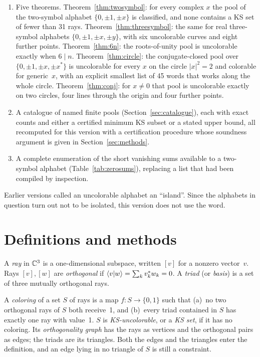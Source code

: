 \begin{enumerate}[label=(\roman*)]
\item Five theorems.  Theorem~\ref{thm:twosymbol}: for every complex $x$ the pool of the
two-symbol alphabet $\{0,\pm1,\pm x\}$ is classified, and none contains a KS set of fewer than
31 rays.  Theorem~\ref{thm:threesymbol}: the same for real three-symbol alphabets
$\{0,\pm1,\pm x,\pm y\}$, with six uncolorable curves and eight further points.
Theorem~\ref{thm:6n}: the roots-of-unity pool is uncolorable exactly when
$6\mid n$.  Theorem~\ref{thm:circle}: the conjugate-closed pool over $\{0,\pm1,\pm x,\pm x^{*}\}$
is uncolorable for every $x$ on the circle $|x|^2=2$ and colorable for generic~$x$, with an
explicit smallest list of 45 words that works along the whole circle.
Theorem~\ref{thm:conj}: for $x\ne0$ that pool is uncolorable exactly on two circles, four lines
through the origin and four further points.
\item A catalogue of named finite pools (Section~\ref{sec:catalogue}), each with exact counts and
either a certified minimum KS subset or a stated upper bound, all recomputed for this version
with a certification procedure whose soundness argument is given in Section~\ref{sec:methods}.
\item A complete enumeration of the short vanishing sums available to a two-symbol alphabet
(Table~\ref{tab:zerosums}), replacing a list that had been compiled by inspection.
\end{enumerate}

Earlier versions called an uncolorable alphabet an ``island''.  Since the alphabets in question
turn out not to be isolated, this version does not use the word.

\section{Definitions and methods}\label{sec:prelim}

\begin{definition}
A \emph{ray} in $\mathbb{C}^3$ is a one-dimensional subspace, written $[v]$ for a nonzero vector~$v$.
Rays $[v],[w]$ are \emph{orthogonal} if $\langle v|w\rangle=\sum_k v_k^{*}w_k=0$.  A \emph{triad} (or
\emph{basis}) is a set of three mutually orthogonal rays.
\end{definition}

\begin{definition}
A \emph{coloring} of a set $S$ of rays is a map $f:S\to\{0,1\}$ such that (a)~no two orthogonal
rays of $S$ both receive~1, and (b)~every triad contained in $S$ has exactly one ray with value~1.
$S$ is \emph{KS-uncolorable}, or a \emph{KS set}, if it has no coloring.  Its \emph{orthogonality
graph} has the rays as vertices and the orthogonal pairs as edges; the triads are its triangles.
Both the edges and the triangles enter the definition, and an edge lying in no triangle of $S$
is still a constraint.
\end{definition}

